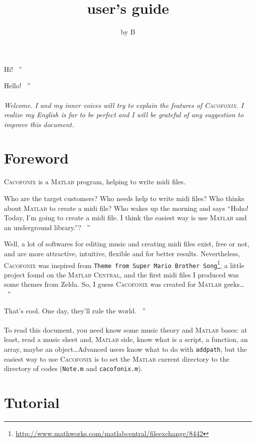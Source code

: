 \documentclass{article}
\title{\cacofonix user's guide}
\author{by B}
\date{}
\newcommand{\cacofonix}{\textsc{Cacofonix}\xspace}
\newcommand{\matlab}{\textsc{Matlab}\xspace}
\newcommand{\file}[1]{\texttt{#1}\xspace}
\newcommand{\noteFile}{\file{Note.m}}
\newcommand{\cacofonixFile}{\file{cacofonix.m}}
\newcommand{\exchange}[2]{\texttt{#1}\footnote{\url{#2}}\xspace}
\newenvironment{meenv}{ \par \noindent \makebox[6em][r]{ \textcolor{mecolor}{Me}: `` --~}}{~''}
\newenvironment{myselfenv}{ \par \noindent \makebox[6em][r]{ \textcolor{myselfcolor}{Myself}: `` --~}}{~''}
\newcommand{ \me }[1]{%
\begin{meenv}%
	#1%
\end{meenv} }
\newcommand{ \myself }[1]{%
\begin{myselfenv}%
	#1%
\end{myselfenv} }
\begin{document}
\maketitle

\me{Hi!}
\myself{Hello!}

\paragraph{}

\emph{Welcome. I and my inner voices will try to explain the features of \cacofonix. I realize my English is far to be perfect and I will be grateful of any suggestion to improve this document.}

\tableofcontents

\section{Foreword}

\cacofonix is a \matlab program, helping to write midi files.

\me{Who are the target customers? Who needs help to write midi files? Who thinks about \matlab to create a midi file? Who wakes up the morning and says ``Hoho! Today, I'm going to create a midi file. I think the easiest way is use \matlab and an underground library.''?}
\myself{Well, a lot of softwares for editing music and creating midi files exist, free or not, and are more attractive, intuitive, flexible and for better results. Nevertheless, \cacofonix was inspired from \exchange{Theme from Super Mario Brother Song}{http://www.mathworks.com/matlabcentral/fileexchange/8442}, a little project found on the \textsc{Matlab Central}, and the first midi files I produced was some themes from Zelda. So, I guess \cacofonix was created for \matlab geeks\dots}
\me{That's cool. One day, they'll rule the world.}

\paragraph{}

To read this document, you need know some music theory and \matlab bases: at least, read a music sheet and, \matlab side, know what is a script, a function, an array, maybe an object\dots Advanced users know what to do with \lstinline!addpath!, but the easiest way to use \cacofonix is to set the \matlab current directory to the directory of codes (\noteFile and \cacofonixFile).

\section{Tutorial}
\end{document}
